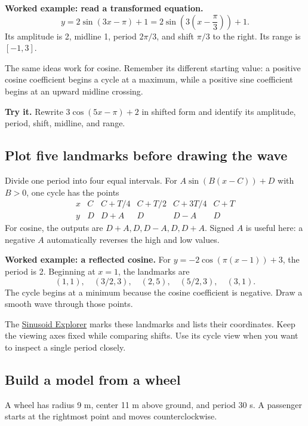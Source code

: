 \textbf{Worked example: read a transformed equation.} \[
y=2\sin(3x-\pi)+1
=2\sin\left(3\left(x-\frac{\pi}{3}\right)\right)+1.
\] Its amplitude is 2, midline 1, period \(2\pi/3\), and shift \(\pi/3\) to the right. Its range is \([-1,3]\).

The same ideas work for cosine. Remember its different starting value: a positive cosine coefficient begins a cycle at a maximum, while a positive sine coefficient begins at an upward midline crossing.

\textbf{Try it.} Rewrite \(3\cos(5x-\pi)+2\) in shifted form and identify its amplitude, period, shift, midline, and range.

\hypertarget{m3-plot-five-landmarks-before-drawing-the-wave}{%
\subsection{Plot five landmarks before drawing the wave}\label{m3-plot-five-landmarks-before-drawing-the-wave}}

Divide one period into four equal intervals. For \(A\sin(B(x-C))+D\) with \(B>0\), one cycle has the points \[
\begin{array}{c|ccccc}
x&C&C+T/4&C+T/2&C+3T/4&C+T\\
\hline
y&D&D+A&D&D-A&D
\end{array}
\] For cosine, the outputs are \(D+A,D,D-A,D,D+A\). Signed \(A\) is useful here: a negative \(A\) automatically reverses the high and low values.

\textbf{Worked example: a reflected cosine.} For \(y=-2\cos(\pi(x-1))+3\), the period is 2. Beginning at \(x=1\), the landmarks are \[
(1,1),\quad(3/2,3),\quad(2,5),\quad(5/2,3),\quad(3,1).
\] The cycle begins at a minimum because the cosine coefficient is negative. Draw a smooth wave through those points.

The \href{https://bobovski66.github.io/PrecalculusII/demos/sinusoid_explorer.html}{Sinusoid Explorer} marks these landmarks and lists their coordinates. Keep the viewing axes fixed while comparing shifts. Use its cycle view when you want to inspect a single period closely.

\hypertarget{m3-build-a-model-from-a-wheel}{%
\subsection{Build a model from a wheel}\label{m3-build-a-model-from-a-wheel}}

A wheel has radius 9 m, center 11 m above ground, and period 30 s. A passenger starts at the rightmost point and moves counterclockwise.

